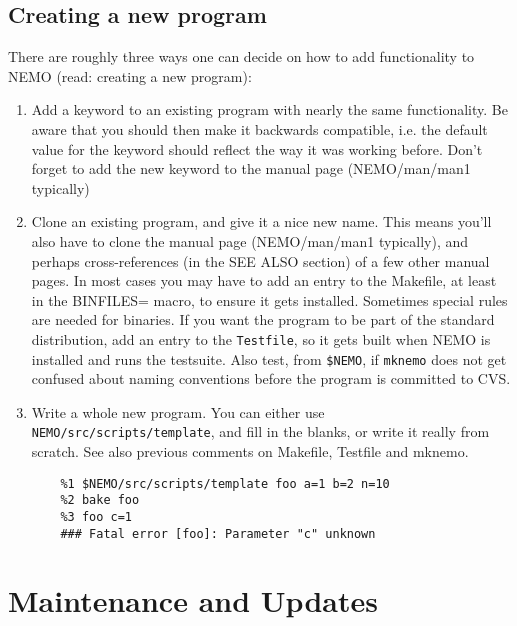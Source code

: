 \section{Creating a new program}

There are roughly three ways one can decide on how to add functionality
to NEMO (read: creating a new program):

\begin{enumerate}
\item  Add a keyword to an existing program with nearly the same functionality.
Be aware that you should
then make it backwards compatible, i.e. the default value for the keyword
should reflect the way it was working before. Don't forget to add
the new keyword to the manual page (NEMO/man/man1 typically)

\item
Clone an existing program, and give it a nice new name. This means you'll also 
have to clone the manual page (NEMO/man/man1 typically), 
and perhaps cross-references (in the SEE ALSO section) of a few other manual
pages. In most cases you may have to add an entry to the Makefile,
at least in the BINFILES= macro, to ensure it gets installed.
Sometimes special rules are needed for binaries.
If you want the program to be part of the standard distribution, add
an entry to the {\tt Testfile}, so it gets built when NEMO is installed
and runs the testsuite.
Also test, from {\tt \$NEMO}, if {\tt mknemo}
does not get confused about naming conventions before the program
is committed to CVS.

\item
Write a whole new program. You can either use {\tt NEMO/src/scripts/template},
and fill in the blanks, or write it really from scratch. See also 
previous comments on Makefile, Testfile and mknemo.

\footnotesize\begin{verbatim}
    %1 $NEMO/src/scripts/template foo a=1 b=2 n=10
    %2 bake foo
    %3 foo c=1 
    ### Fatal error [foo]: Parameter "c" unknown
\end{verbatim}\normalsize

\end{enumerate}

\chapter                {Maintenance and Updates}

